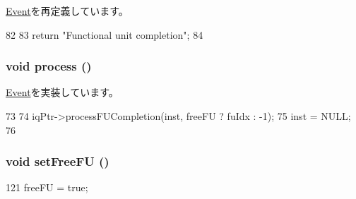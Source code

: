 \hyperlink{classEvent_a130ddddf003422b413e2e891b1b80e8f}{Event}を再定義しています。


\begin{DoxyCode}
82 {
83     return "Functional unit completion";
84 }
\end{DoxyCode}
\hypertarget{classInstructionQueue_1_1FUCompletion_a2e9c5136d19b1a95fc427e0852deab5c}{
\subsubsection[{process}]{\setlength{\rightskip}{0pt plus 5cm}void process ()}}
\label{classInstructionQueue_1_1FUCompletion_a2e9c5136d19b1a95fc427e0852deab5c}


\hyperlink{classEvent_a142b75b68a6291400e20fb0dd905b1c8}{Event}を実装しています。


\begin{DoxyCode}
73 {
74     iqPtr->processFUCompletion(inst, freeFU ? fuIdx : -1);
75     inst = NULL;
76 }
\end{DoxyCode}
\hypertarget{classInstructionQueue_1_1FUCompletion_ae7af3c3f2fa23850b94771ec2838c3fc}{
\subsubsection[{setFreeFU}]{\setlength{\rightskip}{0pt plus 5cm}void setFreeFU ()}}
\label{classInstructionQueue_1_1FUCompletion_ae7af3c3f2fa23850b94771ec2838c3fc}



\begin{DoxyCode}
121 { freeFU = true; }
\end{DoxyCode}


